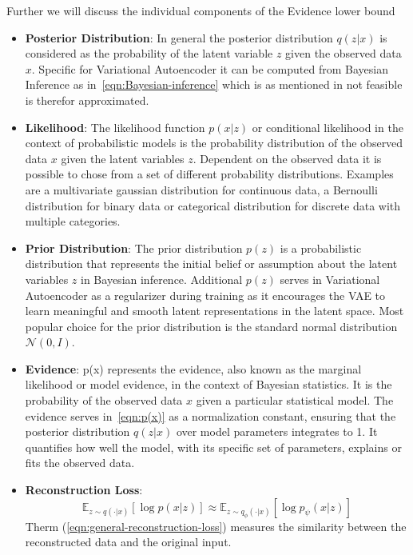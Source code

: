 Further we will discuss the individual components of the Evidence lower bound 
\begin{itemize}
	\item \textbf{Posterior Distribution}: In general the posterior distribution $q(z|x)$ is considered as the probability of the latent variable $z$ given the observed data $x$. Specific for Variational Autoencoder it can be computed from Bayesian Inference as in~\eqref{eqn:Bayesian-inference} which is as mentioned in  not feasible is therefor approximated.
	\item \textbf{Likelihood}: The likelihood function $p(x|z)$ or conditional likelihood in the context of probabilistic models is the probability distribution of the observed data $x$ given the latent variables $z$. Dependent on the observed data it is possible to chose from a set of different probability distributions. Examples are a multivariate gaussian distribution for continuous data, a Bernoulli distribution for binary data or categorical distribution for discrete data with multiple categories.
	\item \textbf{Prior Distribution}: The prior distribution $p(z)$ is a probabilistic distribution that represents the initial belief or assumption about the latent variables $z$ in Bayesian inference. Additional $p(z)$ serves in Variational Autoencoder as a regularizer during training as it encourages the VAE to learn meaningful and smooth latent representations in the latent space. Most popular choice for the prior distribution is the standard normal distribution $\mathcal{N}(0, I)$.  
	\item \textbf{Evidence}: p(x) represents the evidence, also known as the marginal likelihood or model evidence, in the context of Bayesian statistics. It is the probability of the observed data $x$ given a particular statistical model. The evidence serves in~\eqref{eqn:p(x)} as a normalization constant, ensuring that the posterior distribution $q(z|x)$ over model parameters integrates to 1. It quantifies how well the model, with its specific set of parameters, explains or fits the observed data.
	\item \textbf{Reconstruction Loss}: 
	\begin{equation}\label{eqn:general-reconstruction-loss}
		\mathbb{E}_{z\sim q(\cdot|x)} \left[ \log p(x|z) \right] \approx \mathbb{E}_{z\sim q_\phi(\cdot|x)} \left[ \log p_\psi(x|z) \right]
	\end{equation}
	Therm (\ref{eqn:general-reconstruction-loss}) measures the similarity between the reconstructed data and the original input. 

\end{itemize}
